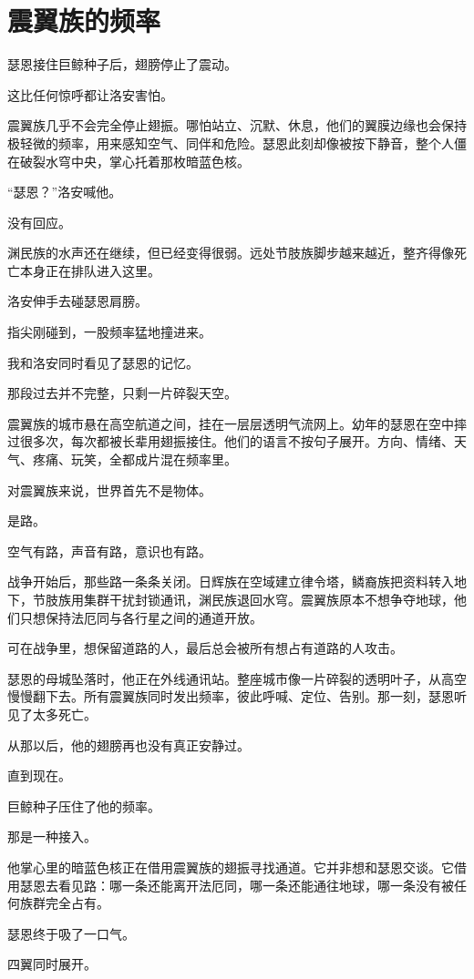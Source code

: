 \chapter{震翼族的频率}

瑟恩接住巨鲸种子后，翅膀停止了震动。

这比任何惊呼都让洛安害怕。

震翼族几乎不会完全停止翅振。哪怕站立、沉默、休息，他们的翼膜边缘也会保持极轻微的频率，用来感知空气、同伴和危险。瑟恩此刻却像被按下静音，整个人僵在破裂水穹中央，掌心托着那枚暗蓝色核。

“瑟恩？”洛安喊他。

没有回应。

渊民族的水声还在继续，但已经变得很弱。远处节肢族脚步越来越近，整齐得像死亡本身正在排队进入这里。

洛安伸手去碰瑟恩肩膀。

指尖刚碰到，一股频率猛地撞进来。

我和洛安同时看见了瑟恩的记忆。

那段过去并不完整，只剩一片碎裂天空。

震翼族的城市悬在高空航道之间，挂在一层层透明气流网上。幼年的瑟恩在空中摔过很多次，每次都被长辈用翅振接住。他们的语言不按句子展开。方向、情绪、天气、疼痛、玩笑，全都成片混在频率里。

对震翼族来说，世界首先不是物体。

是路。

空气有路，声音有路，意识也有路。

战争开始后，那些路一条条关闭。日辉族在空域建立律令塔，鳞裔族把资料转入地下，节肢族用集群干扰封锁通讯，渊民族退回水穹。震翼族原本不想争夺地球，他们只想保持法厄同与各行星之间的通道开放。

可在战争里，想保留道路的人，最后总会被所有想占有道路的人攻击。

瑟恩的母城坠落时，他正在外线通讯站。整座城市像一片碎裂的透明叶子，从高空慢慢翻下去。所有震翼族同时发出频率，彼此呼喊、定位、告别。那一刻，瑟恩听见了太多死亡。

从那以后，他的翅膀再也没有真正安静过。

直到现在。

巨鲸种子压住了他的频率。

那是一种接入。

他掌心里的暗蓝色核正在借用震翼族的翅振寻找通道。它并非想和瑟恩交谈。它借用瑟恩去看见路：哪一条还能离开法厄同，哪一条还能通往地球，哪一条没有被任何族群完全占有。

瑟恩终于吸了一口气。

四翼同时展开。

